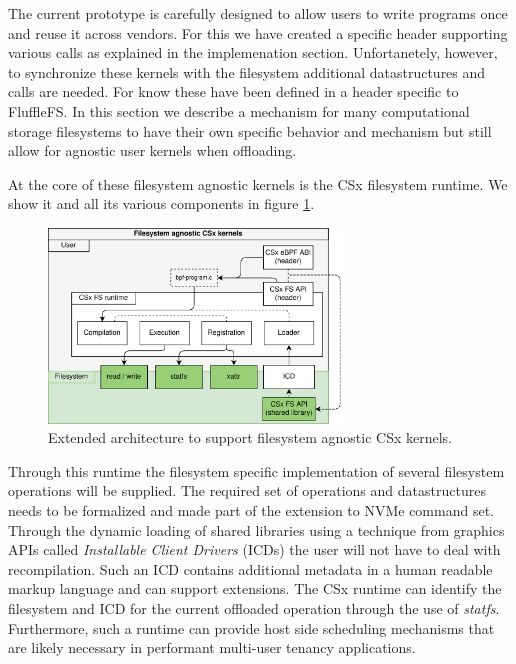 The current prototype is carefully designed to allow users to write programs
once and reuse it across vendors. For this we have created a specific header
supporting various calls as explained in the implemenation section.
Unfortanetely, however, to synchronize these kernels with the filesystem
additional datastructures and calls are needed. For know these have been defined
in a header specific to FluffleFS. In this section we describe a mechanism for
many computational storage filesystems to have their own specific behavior and
mechanism but still allow for agnostic user kernels when offloading.

At the core of these filesystem agnostic kernels is the CSx filesystem runtime.
We show it and all its various components in figure \ref{figure:csxfsruntime}.

\begin{figure}[H]
    \centering
	\includegraphics[width=0.7\textwidth]{resources/images/csx-fs-agnostic.png}
	\caption{Extended architecture to support filesystem agnostic CSx kernels.}
    \label{figure:csxfsruntime}
\end{figure}

Through this runtime the filesystem specific implementation of several
filesystem operations will be supplied. The required set of operations and
datastructures needs to be formalized and made part of the extension to NVMe
command set. Through the dynamic loading of shared libraries using a technique
from graphics APIs called \textit{Installable Client Drivers} (ICDs) the user
will not have to deal with recompilation. Such an ICD contains additional
metadata in a human readable markup language and can support extensions. The
CSx runtime can identify the filesystem and ICD for the current offloaded
operation through the use of \textit{statfs}. Furthermore, such a runtime can
provide host side scheduling mechanisms that are likely necessary in performant
multi-user tenancy applications.

